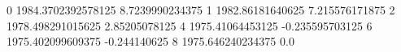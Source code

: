 0 1984.3702392578125 8.7239990234375
1 1982.86181640625 7.215576171875
2 1978.498291015625 2.85205078125
4 1975.41064453125 -0.235595703125
6 1975.402099609375 -0.244140625
8 1975.646240234375 0.0
